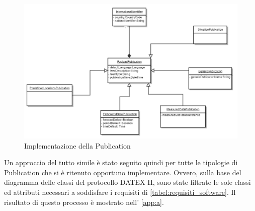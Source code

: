 \begin{figure}
	\begin{center}
		\includegraphics[width=0.8\columnwidth]{images/datexii_publication_implementation}
	\end{center}
	\caption{Implementazione della Publication}
	\label{fig:datexii_publication_implementation}
\end{figure}
Un approccio del tutto simile è stato seguito quindi per tutte le tipologie di Publication che si è ritenuto opportuno implementare. Ovvero, sulla base del diagramma delle classi del protocollo DATEX II, sono state filtrate le sole classi ed attributi necessari a soddisfare i requisiti di \autoref{tabel:requisiti_software}. Il risultato di questo processo è mostrato nell' \autoref{app:a}.


